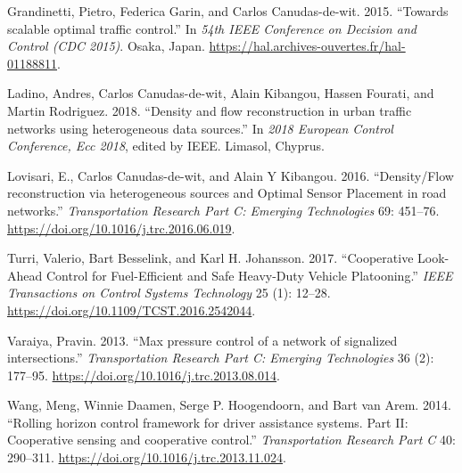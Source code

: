 \documentclass[]{book}
\theoremstyle{definition}
\theoremstyle{definition}
\theoremstyle{definition}
\theoremstyle{remark}
\begin{document}
\leavevmode\hypertarget{ref-Grandinetti2016}{}%
Grandinetti, Pietro, Federica Garin, and Carlos Canudas-de-wit. 2015.
``Towards scalable optimal traffic control.'' In \emph{54th IEEE
Conference on Decision and Control (CDC 2015)}. Osaka, Japan.
\url{https://hal.archives-ouvertes.fr/hal-01188811}.

\leavevmode\hypertarget{ref-Ladino2018}{}%
Ladino, Andres, Carlos Canudas-de-wit, Alain Kibangou, Hassen Fourati,
and Martin Rodriguez. 2018. ``Density and flow reconstruction in urban
traffic networks using heterogeneous data sources.'' In \emph{2018
European Control Conference, Ecc 2018}, edited by IEEE. Limasol,
Chyprus.

\leavevmode\hypertarget{ref-Lovisari2016}{}%
Lovisari, E., Carlos Canudas-de-wit, and Alain Y Kibangou. 2016.
``Density/Flow reconstruction via heterogeneous sources and Optimal
Sensor Placement in road networks.'' \emph{Transportation Research Part
C: Emerging Technologies} 69: 451--76.
\url{https://doi.org/10.1016/j.trc.2016.06.019}.

\leavevmode\hypertarget{ref-Turri2017}{}%
Turri, Valerio, Bart Besselink, and Karl H. Johansson. 2017.
``Cooperative Look-Ahead Control for Fuel-Efficient and Safe Heavy-Duty
Vehicle Platooning.'' \emph{IEEE Transactions on Control Systems
Technology} 25 (1): 12--28.
\url{https://doi.org/10.1109/TCST.2016.2542044}.

\leavevmode\hypertarget{ref-Varaiya2013:TR-C}{}%
Varaiya, Pravin. 2013. ``Max pressure control of a network of signalized
intersections.'' \emph{Transportation Research Part C: Emerging
Technologies} 36 (2): 177--95.
\url{https://doi.org/10.1016/j.trc.2013.08.014}.

\leavevmode\hypertarget{ref-Meng2014b:TR-C}{}%
Wang, Meng, Winnie Daamen, Serge P. Hoogendoorn, and Bart van Arem.
2014. ``Rolling horizon control framework for driver assistance systems.
Part II: Cooperative sensing and cooperative control.''
\emph{Transportation Research Part C} 40: 290--311.
\url{https://doi.org/10.1016/j.trc.2013.11.024}.
\end{document}
